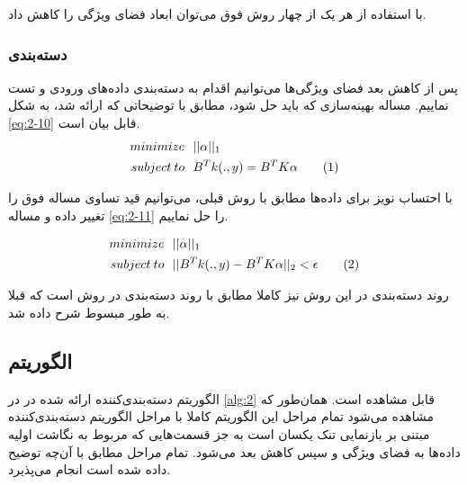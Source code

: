 \documentclass[12pt,twocolumn]{article}
\newcommand\numberthis[1][]{%
    \refstepcounter{equation}%
    \ifx#1\empty\else\label{eq:#1}\fi%
    \tag{\theequation}%
}
\begin{document}
  با استفاده از هر یک از چهار روش فوق می‌توان ابعاد فضای ویژگی را کاهش داد.

\subsubsection{دسته‌بندی}
پس از کاهش بعد فضای ویژگی‌ها می‌توانیم اقدام به دسته‌بندی داده‌های ورودی و تست نماییم. مساله بهینه‌سازی که باید حل شود، مطابق با توضیحاتی که ارائه شد، به شکل \eqref{eq:2-10} قابل بیان است.
\begin{align*}
minimize& \>\>\> ||\alpha||_1  \\
subject \> to& \>\>\> B^Tk(.,y) = B^TK\alpha
\numberthis
\label{eq:2-10}
\end{align*}

 با احتساب نویز برای داده‌ها مطابق با روش قبلی، می‌توانیم قید تساوی مساله فوق را تغییر داده و مساله 
 \eqref{eq:2-11}
  را حل نماییم.
  
\begin{align*}
minimize& \>\>\> ||\alpha||_1  \\
subject \> to& \>\>\> ||B^Tk(.,y) - B^TK\alpha||_2 < \epsilon
\numberthis
\label{eq:2-11}
\end{align*} 
 
روند دسته‌بندی در این روش نیز کاملا مطابق با روند دسته‌بندی در روش  است که قبلا به طور مبسوط شرح داده شد.


\subsection{الگوریتم}

الگوریتم دسته‌بندی‌کننده ارائه شده در \cite{zhang2012kernel} در \ref{alg:2} قابل مشاهده است. همان‌طور که مشاهده می‌شود تمام مراحل این الگوریتم کاملا با مراحل الگوریتم دسته‌بندی‌کننده مبتنی بر بازنمایی تنک یکسان است به جز قسمت‌هایی که مربوط به نگاشت اولیه داده‌ها به فضای ویژگی و سپس کاهش بعد می‌شود. تمام مراحل مطابق با آن‌چه توضیح داده‌ شده است انجام می‌پذیرد.
\end{document}
